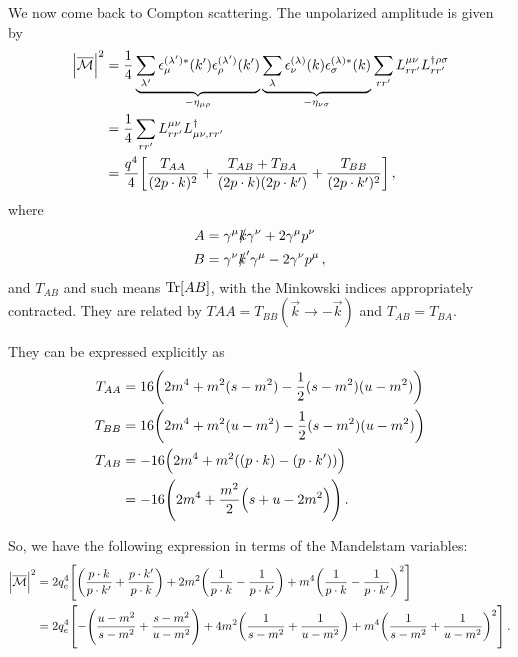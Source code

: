 \documentclass[main.tex]{subfiles}
\begin{document}
We now come back to Compton scattering. The unpolarized amplitude is given by 
%
\begin{align}
\abs{\mathcal{\overline{M}}}^2 &= 
\frac{1}{4} 
\underbrace{\sum_{\lambda' } 
\epsilon_{\mu }^{(\lambda' )*} (k')
\epsilon_{\rho }^{(\lambda' )} (k')}_{- \eta_{\mu \rho }}
\underbrace{\sum_{\lambda } 
\epsilon_{\nu }^{(\lambda )} (k)
\epsilon_{\sigma }^{(\lambda )*} (k)}_{- \eta_{\nu \sigma }}
\sum _{r r'} 
L^{\mu \nu }_{r r'}
L^{\dag \rho \sigma  }_{r r'}  \\
&= \frac{1}{4} 
\sum _{rr'}
L^{\mu \nu }_{r r'}
L^{\dag}_{ \mu \nu, r r'}  \\
&= \frac{q^{4}}{4}
\qty[ \frac{T_{AA}}{(2 p \cdot k)^2} +\frac{T_{AB} + T_{BA}}{(2 p \cdot k) (2 p \cdot k')} + \frac{T_{BB}}{(2 p \cdot k')^2}]
\,,
\end{align}
%
where 
%
\begin{align}
A &= \gamma^{\mu } \slashed{k} \gamma^{\nu } + 2 \gamma^{\mu } p^{\nu } \\
B &= \gamma^{\nu } \slashed{k}' \gamma^{\mu } - 2 \gamma^{\nu } p^{\mu } 
\,,
\end{align}
%
and \(T_{AB}\) and such means \(\Tr[AB]\), with the Minkowski indices appropriately contracted. They are related by \(T{AA} = T_{BB} (\vec{k} \to -\vec{k})\) and \(T_{AB} = T_{BA}\). 

\begin{claim}
They can be expressed explicitly as 
%
\begin{align}
T_{AA} &= 16 \qty( 2 m^{4} + m^2 (s - m^2) - \frac{1}{2} (s - m^2) (u - m^2)) \\
T_{BB} &= 16 \qty( 2 m^{4} + m^2 (u - m^2) - \frac{1}{2} (s - m^2) (u - m^2)) \\
T_{AB} &= - 16 \qty( 2 m^{4} + m^2 ((p \cdot k) - (p \cdot k')))  \\
&= - 16 \qty( 2 m^{4} + \frac{m^2}{2} \qty(s + u - 2 m^2) )
\,.
\end{align}
\end{claim}

So, we have the following expression in terms of the Mandelstam variables: 
%
\begin{align}
\abs{\mathcal{\overline{M}}}^2 
&= 2 q_e^{4}  \qty[
\qty(
    \frac{p \cdot k}{p \cdot k'} +
    \frac{p \cdot k'}{p \cdot k}
)
+ 2 m^2
\qty(
    \frac{1}{p \cdot k} -
    \frac{1}{p \cdot k '} 
)
+ m^{4} 
\qty(
    \frac{1}{p \cdot k} -
    \frac{1}{p \cdot k '} 
)^2  
]\\
&=
2 q_e^{4}
\qty[
- \qty(
    \frac{u - m^2}{s - m^2} + 
    \frac{s - m^2}{u - m^2}
)
+ 4 m^2 
\qty(
    \frac{1}{s - m^2} + 
    \frac{1}{u - m^2} 
)
+ m^{4} 
\qty(
    \frac{1}{s - m^2} + 
    \frac{1}{u - m^2} 
)^2
]
\,.
\end{align}
\end{document}
